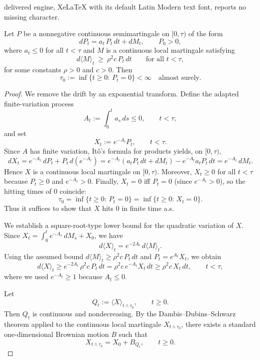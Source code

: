 \documentclass[10pt,a4paper]{amsart}
\begin{document}
delivered engine, XeLaTeX with its default Latin Modern text font, reports no missing character.
\begin{lemma}\label{lem:A6_domination_form_A}
Let $P$ be a nonnegative continuous semimartingale on $[0,\tau)$ of the form
\[
dP_t = a_t\,P_t\,dt + dM_t,\qquad P_0>0,
\]
where $a_t\le 0$ for all $t<\tau$ and $M$ is a continuous local martingale satisfying
\[
d\langle M\rangle_t \ \ge\ \rho^2 c\,P_t\,dt
\qquad\text{for all }t<\tau,
\]
for some constants $\rho>0$ and $c>0$.
Then
\[
\tau_0:=\inf\{t\ge 0:\,P_t=0\}<\infty\quad\text{almost surely}.
\]
\end{lemma}

\begin{proof}
We remove the drift by an exponential transform.
Define the adapted finite-variation process
\[
A_t:=\int_0^t a_s\,ds \le 0,
\qquad t<\tau,
\]
and set
\[
X_t:=e^{-A_t}P_t,\qquad t<\tau.
\]
Since $A$ has finite variation, It\^{o}'s formula for products yields, on $[0,\tau)$,
\[
dX_t = e^{-A_t}\,dP_t + P_t\,d(e^{-A_t})
= e^{-A_t}(a_tP_t\,dt+dM_t) - e^{-A_t}a_tP_t\,dt
= e^{-A_t}\,dM_t.
\]
Hence $X$ is a continuous local martingale on $[0,\tau)$.
Moreover, $X_t\ge 0$ for all $t<\tau$ because $P_t\ge 0$ and $e^{-A_t}>0$.
Finally, $X_t=0$ iff $P_t=0$ (since $e^{-A_t}>0$), so the hitting times of $0$ coincide:
\[
\tau_0=\inf\{t\ge0:\,P_t=0\}=\inf\{t\ge0:\,X_t=0\}.
\]
Thus it suffices to show that $X$ hits $0$ in finite time a.s.

We establish a square-root-type lower bound for the quadratic variation of $X$.
Since $X_t=\int_0^t e^{-A_s}\,dM_s + X_0$, we have
\[
d\langle X\rangle_t = e^{-2A_t}\,d\langle M\rangle_t.
\]
Using the assumed bound $d\langle M\rangle_t\ge \rho^2 c\,P_t\,dt$ and $P_t=e^{A_t}X_t$, we obtain
\begin{equation}\label{eq:qv_lower_bound_X}
d\langle X\rangle_t
\ge e^{-2A_t}\,\rho^2 c\,P_t\,dt
= \rho^2 c\,e^{-A_t}X_t\,dt
\ge \rho^2 c\,X_t\,dt,
\qquad t<\tau,
\end{equation}
where we used $e^{-A_t}\ge 1$ because $A_t\le 0$.

Let
\[
Q_t:=\langle X\rangle_{t\wedge\tau_0},\qquad t\ge0.
\]
Then $Q_t$ is continuous and nondecreasing.
By the Dambis--Dubins--Schwarz theorem applied to the continuous local martingale $X_{t\wedge\tau_0}$,
there exists a standard one-dimensional Brownian motion $B$ such that
\begin{equation}\label{eq:DDS_representation}
X_{t\wedge\tau_0} = X_0 + B_{Q_t},\qquad t\ge0.
\end{equation}


\end{proof}
\end{document}

